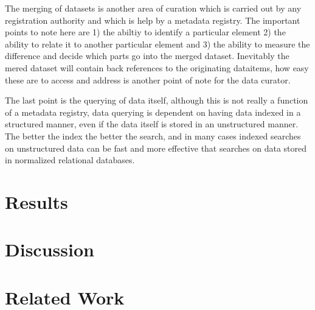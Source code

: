 \documentclass{llncs}
\begin{document}
The merging of datasets is another area of curation which is carried out by any registration authority and which is help by a metadata registry. The important points to note here are 1) the abiltiy to identify a particular element 2) the ability to relate it to another particular element and 3) the ability to measure the difference and decide which parts go into the merged dataset. Inevitably the mered dataset will contain back references to the originating dataitems, how easy these are to access and address is another point of note for the data curator.

The last point is the querying of data itself, although this is not really a function of a metadata registry, data querying is dependent on having data indexed in a structured manner, even if the data itself is stored in an unstructured manner. The better the index the better the search, and in many cases indexed searches on unstructured data can be fast and more effective that searches on data stored in normalized relational databases. 



\section{Results}




\section{Discussion}

\section{Related Work}

 


\newpage




\end{document}
